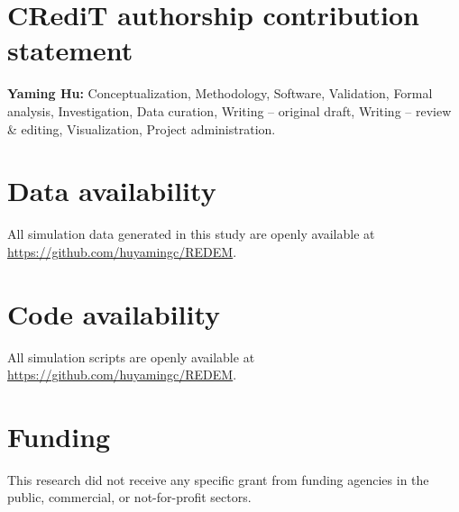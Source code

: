 \documentclass[11pt]{article}
\begin{document}
\section*{CRediT authorship contribution statement}

\textbf{Yaming Hu:} Conceptualization, Methodology, Software, Validation,
Formal analysis, Investigation, Data curation, Writing -- original draft,
Writing -- review \& editing, Visualization, Project administration.

\section*{Data availability}

All simulation data generated in this study are openly available at
\url{https://github.com/huyamingc/REDEM}.

\section*{Code availability}

All simulation scripts are openly available at
\url{https://github.com/huyamingc/REDEM}.

\section*{Funding}

This research did not receive any specific grant from funding agencies in
the public, commercial, or not-for-profit sectors.
\end{document}
